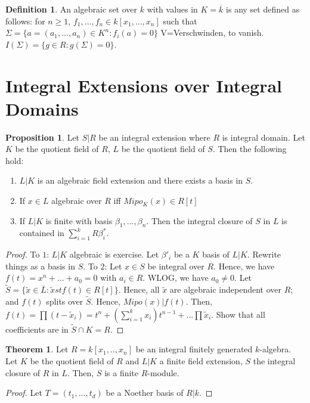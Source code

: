 \documentclass{article}
\theoremstyle{definition}
\newtheorem{theorem}{Theorem}[section]
\theoremstyle{definition}
\theoremstyle{definition}
\newtheorem{proposition}{Proposition}[section]
\theoremstyle{definition}
\theoremstyle{definition}
\newtheorem{definition}{Definition}[section]
\theoremstyle{definition}
\theoremstyle{definition}
\begin{document}
\begin{tcolorbox}[colback=purple!5!white,colframe=purple!75!black]
\begin{definition}
An algebraic set over $k$ with values in $K=\overline{k}$ is any set defined as follows: for $n\geq 1$, $f_1,...,f_n\in k[x_1,...,x_n]$ such that $\Sigma=\{ a=(a_1,...,a_n)\in K^n: f_i(a)=0 \}$ V=Verschwinden, to vanish. $I(\Sigma)=\{ g\in R: g(\Sigma)=0 \}$. 
\end{definition}
\end{tcolorbox}

\section{Integral Extensions over Integral Domains}

\begin{tcolorbox}[colback=blue!5!white,colframe=blue!30!white]
\begin{proposition}
Let $S|R$ be an integral extension where $R$ is integral domain. Let $K$ be the quotient field of $R$, $L$ be the quotient field of $S$. Then the following hold:
\begin{enumerate}
    \item $L|K$ is an algebraic field extension and there exists a basis in $S$. 
    \item If $x\in L$ algebraic over $R$ iff $Mipo_K(x)\in R[t]$
    \item If $L|K$ is finite with basis $\beta_1,...,\beta_n$. Then the integral closure of $S$ in $L$ is contained in $\sum_{i=1}^{k} R\beta^*_i$. 
\end{enumerate} 
\end{proposition}
\end{tcolorbox}
\begin{proof}
    To $1$: $L|K$ algebraic is exercise.  Let $\beta'_i$ be a $K$ basis of $L|K$. Rewrite things as a basis in $S$. 
    To $2$: Let $x\in S$ be integral over $R$. Hence, we have $f(t)=x^n+...+a_0=0$ with $a_i\in R$. WLOG, we have $a_0\neq 0$. Let $\tilde{S}=\{ \tilde{x}\in \overline{L}: \tilde{x} st f(t)\in R[t] \}$. Hence, all $\tilde{x}$ are algebraic independent over $R$; and $f(t)$ splits over $\tilde{S}$. Hence, $Mipo(x)|f(t)$. Then, $f(t)=\prod (t-\tilde{x}_i)=t^n+(\sum_{i=1}^{k}x_i)t^{n-1}+...\prod \tilde{x}_i$. Show that all coefficients are in $\tilde{S}\cap K=R$. 
\end{proof}

\begin{tcolorbox}[colback=red!5!white,colframe=red!30!white]
    \begin{theorem}
    Let $R=k[x_1,..,x_n]$ be an integral finitely generated $k$-algebra. Let $K$ be the quotient field of $R$ and $L|K$ a finite field extension, $S$ the integral closure of $R$ in $L$. Then, $S$ is a finite $R$-module.
    \end{theorem}
    \end{tcolorbox}
    \begin{proof}
        Let $T=(t_1,...,t_d)$ be a Noether basis of $R|k$. 
    \end{proof}
    
\end{document}

